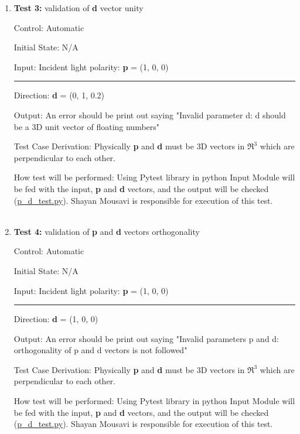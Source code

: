 \documentclass[12pt, titlepage]{article}
\begin{document}
\begin{enumerate}
\item{\textbf{Test 3:} validation of \textbf{d} vector unity \\}

Control: Automatic

Initial State: N/A

Input: Incident light polarity: \textbf{p} = (1, 0, 0)\\
\rule{1.15cm}{0pt} Direction: \textbf{d} = (0, 1, 0.2)

Output: An error should be print out saying "Invalid parameter d: d should be a 3D unit vector of floating numbers"  

Test Case Derivation: Physically \textbf{p} and \textbf{d} must be 3D vectors in $\Re^3$ which are perpendicular to each other.

How test will be performed: Using Pytest library in python Input Module will be fed with the input, \textbf{p} and \textbf{d} vectors, and the output will be checked (\href{https://github.com/shmouses/SPDFM/tree/master/src}{p\_d\_test.py}). Shayan Mousavi is responsible for execution of this test.
\\
\\

\item{\textbf{Test 4:} validation of \textbf{p} and \textbf{d} vectors orthogonality \\}

Control: Automatic

Initial State: N/A

Input: Incident light polarity: \textbf{p} = (1, 0, 0)\\
\rule{1.15cm}{0pt} Direction: \textbf{d} = (1, 0, 0)

Output: An error should be print out saying "Invalid parameters p and d: orthogonality of p and d vectors is not followed"  

Test Case Derivation: Physically \textbf{p} and \textbf{d} must be 3D vectors in $\Re^3$ which are perpendicular to each other.

How test will be performed: Using Pytest library in python Input Module will be fed with the input, \textbf{p} and \textbf{d} vectors, and the output will be checked (\href{https://github.com/shmouses/SPDFM/tree/master/src}{p\_d\_test.py}). Shayan Mousavi is responsible for execution of this test.
\\
\\


\end{enumerate}
\end{document}
